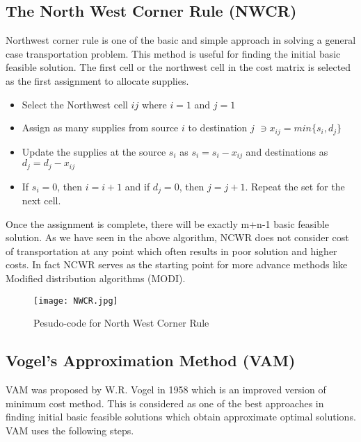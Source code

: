 \documentclass[12pt]{article}
\theoremstyle{definition}
\theoremstyle{definition}
\numberwithin{equation}{section}
\begin{document}
\subsection{The North West Corner Rule (NWCR)}
Northwest corner rule is one of the basic and simple approach in solving a general case transportation problem. This method is useful for finding the initial basic feasible solution. The first cell or the northwest cell in the cost matrix is selected as the first assignment to allocate supplies\cite{a3}.

\begin{itemize} 
\item Select the Northwest cell $ij$ where $i=1$ and $j=1$
\item Assign as many supplies from source $i$ to destination $j$ $\ni x_{ij} = min\big \{ s_{i},d_{j}\big \}$
\item Update the supplies at the source $s_{i}$ as $s_{i}=s_{i}-x_{ij}$ and destinations as $d_{j}=d_{j}-x_{ij}$
\item If $s_{i}=0$, then $i=i+1$ and if $d_{j}=0$, then $j=j+1$. Repeat the set for the next cell. 
\end{itemize}

Once the assignment is complete, there will be exactly m+n-1 basic feasible solution.  As we have seen in the above algorithm, NCWR  does not consider cost of transportation at any point which often results in poor solution and higher costs\cite{a8}. In fact NCWR serves as the starting point for more advance methods like Modified distribution algorithms (MODI)\cite{a8}.

\begin{figure}[h]
\texttt{[image: NWCR.jpg]}
\caption{Pesudo-code for North West Corner Rule}
\end{figure}

\subsection{Vogel's Approximation Method (VAM)}
VAM was proposed by W.R. Vogel in 1958  which is an improved version of minimum cost method\cite{a9}. This is considered as one of the best approaches in finding initial basic feasible solutions which obtain approximate optimal solutions. VAM uses the following steps.
\end{document}
